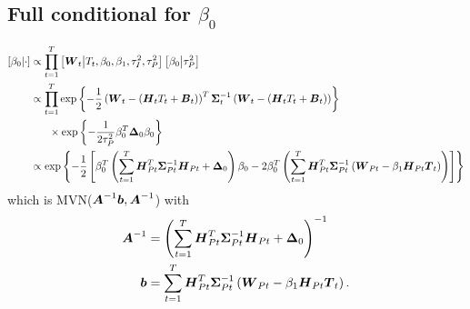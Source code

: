\documentclass{article}\usepackage[]{graphicx}\usepackage[]{color}
\def\bm#1{\mbox{\boldmath $#1$}}
\begin{document}
\subsection{Full conditional for $\beta_0$}
%
\begin{align*}
%
\left[ \beta_0 \middle| \cdot \right] & \propto \prod_{t = 1}^T \left[ \bm{W}_t \middle| T_t, \beta_0, \beta_1, \tau^2_I, \tau^2_P \right] \left[ \beta_0 \middle| \tau^2_P \right]\\
%
& \propto \prod_{t = 1}^T \exp{ \left\{ - \frac{1} {2} \left( \bm{W}_t - \left( \bm{H}_t T_t + \bm{B}_t \right) \right)^T \bm{\Sigma}_t^{ - 1} \left( \bm{W}_t - \left( \bm{H}_t T_t + \bm{B}_t \right) \right) \right\} }\\
& \hspace{6mm} \times \exp{ \left\{ - \frac{1} {2 \tau^2_P} \beta_0^T \bm{\Delta}_0 \beta_0 \right\} } \\
%
& \propto \exp{ \left\{ - \frac{1} {2} \left[ \beta_0^T \left( \sum_{t = 1}^T \bm{H}_{Pt}^T \bm{\Sigma}_{Pt}^{ - 1} \bm{H}_{Pt} + \bm{\Delta}_0 \right) \beta_0 - 2 \beta_0^T \left( \sum_{t = 1}^T \bm{H}_{Pt}^T \bm{\Sigma}_{Pt}^{ - 1} \left( \bm{W}_{Pt} - \beta_1 \bm{H}_{Pt} \bm{T}_t \right) \right) \right] \right\} }\\
%
\end{align*}
%
which is MVN($\bm{A}^{ - 1}\bm{b}, \bm{A}^{ - 1}$) with \\
\begin{align*}
%
\bm{A}^{ - 1} & =  \left( \sum_{t = 1}^T \bm{H}_{Pt}^T \bm{\Sigma}_{Pt}^{ - 1} \bm{H}_{Pt} + \bm{\Delta}_0 \right)^{ - 1} \\
%
\bm{b} & =  \sum_{t = 1}^T \bm{H}_{Pt}^T \bm{\Sigma}_{Pt}^{ - 1} \left( \bm{W}_{Pt} - \beta_1 \bm{H}_{Pt} \bm{T}_t \right). \\
%
\end{align*}
%
%
\end{document}
